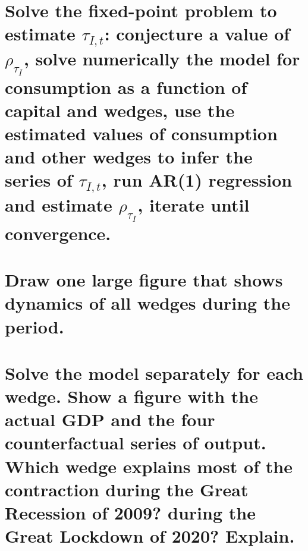 \documentclass[12pt,oneside,reqno]{amsart}
\begin{document}
\section{Solve the fixed-point problem to estimate $\tau_{I,t}$:  conjecture a value of $\rho_{\tau_I}$, solve numerically the model for consumption as a function of capital and wedges, use the estimated values of consumption and other wedges to infer the series of $\tau_{I,t}$, run AR(1) regression and estimate $\rho_{\tau_I}$, iterate until convergence.}


\section{Draw one large figure that shows dynamics of all wedges during the period.}


\section{Solve the model separately for each wedge.  Show a figure with the actual GDP and the four counterfactual series of output.  Which wedge explains most of the contraction during the Great Recession of 2009?  during the Great Lockdown of 2020?  Explain.}
\end{document}
